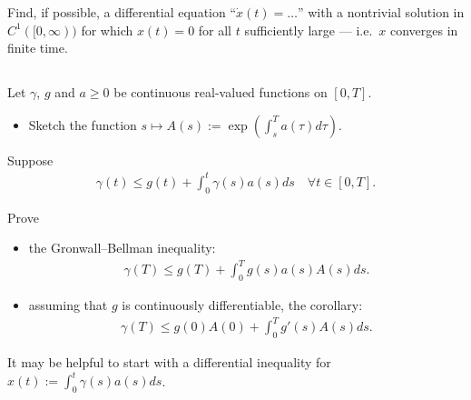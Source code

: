 \documentclass[12pt,a4paper]{article}
\begin{document}
    Find, if possible,
    a differential equation ``$\dot{x}(t) = \ldots$''
    with a nontrivial solution in $C^1([0, \infty))$
    for which
    $x(t) = 0$ for all $t$ sufficiently large ---
    i.e.~$x$ converges in finite time.
    
    
    
    \subsection{}
    
    
    Let $\gamma$, $g$ and $a \geq 0$ be continuous real-valued
    functions on $[0, T]$.
    
    \begin{itemize}
    \item
        Sketch 
        the function
        $
            s \mapsto A(s) :=
            \exp( \int_s^T a(\tau) d\tau )
        $.
    \end{itemize}
    
    Suppose 
    \begin{align}
        \gamma(t) 
        \leq 
        g(t) +
        \int_0^t \gamma(s) a(s) ds
        \quad
        \forall t \in [0, T]
        .
    \end{align}

    
    Prove
    
    \begin{itemize}
    \item 
        the Gronwall--Bellman inequality:
        \begin{align}
            \gamma(T) 
            \leq
            g(T) +
            \int_0^T g(s) a(s) A(s) ds
            .
        \end{align}
    \item
        assuming that $g$ is continuously differentiable,
        the corollary:
        \begin{align}
            \gamma(T) 
            \leq 
            g(0) A(0)
            +
            \int_0^T g'(s) A(s) ds
            .
        \end{align}
    \end{itemize}
        
    It may be helpful to
    start with a differential inequality for 
    $x(t) := \int_0^t \gamma(s) a(s) ds$.

    
\end{document}
